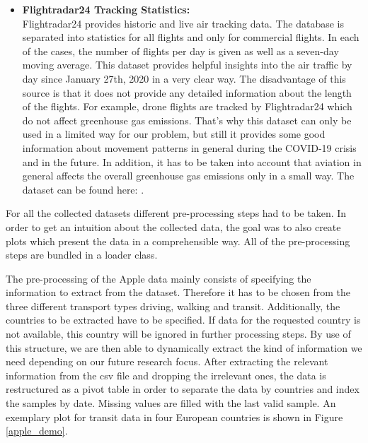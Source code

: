 \begin{itemize}
\item \textbf{Flightradar24 Tracking Statistics:}\\
Flightradar24 provides historic and live air tracking data. The database is separated into statistics for all flights and only for commercial flights. In each of the cases, the number of flights per day is given as well as a seven-day moving average. This dataset provides helpful insights into the air traffic by day since January 27th, 2020 in a very clear way. The disadvantage of this source is that it does not provide any detailed information about the length of the flights. For example, drone flights are tracked by Flightradar24 which do not affect greenhouse gas emissions. That's why this dataset can only be used in a limited way for our problem, but still it provides some good information about movement patterns in general during the COVID-19 crisis and in the future. In addition, it has to be taken into account that aviation in general affects the overall greenhouse gas emissions only in a small way. The dataset can be found here: \cite{Flightradar24}.

\end{itemize}




For all the collected datasets different pre-processing steps had to be taken. In order to get an intuition about the collected data, the goal was to also create plots which present the data in a comprehensible way. All of the pre-processing steps are bundled in a loader class.

The pre-processing of the Apple data mainly consists of specifying the information to extract from the dataset. Therefore it has to be chosen from the three different transport types driving, walking and transit. Additionally, the countries to be extracted have to be specified. If data for the requested country is not available, this country will be ignored in further processing steps. By use of this structure, we are then able to dynamically extract the kind of information we need depending on our future research focus. After extracting the relevant information from the csv file and dropping the irrelevant ones, the data is restructured as a pivot table in order to separate the data by countries and index the samples by date. Missing values are filled with the last valid sample. An exemplary plot for transit data in four European countries is shown in Figure \ref{apple_demo}.

